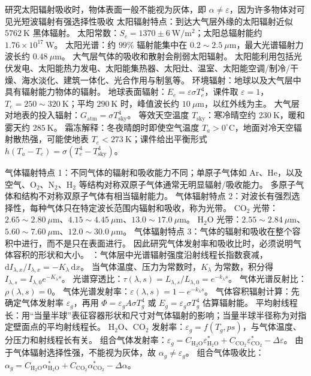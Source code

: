 
研究太阳辐射吸收时，物体表面一般不能视为灰体，即 $\alpha\ne\varepsilon$，因为许多物体对可见光短波辐射有强选择性吸收
太阳辐射特点：到达大气层外缘的太阳辐射近似 $5762\ \mathrm{K}$ 黑体辐射。
太阳常数：$S_c=1370\pm6\ \mathrm{W/m^2}$；太阳总辐射能约 $1.76\times10^{17}\ \mathrm{W}$。
太阳光谱：约 $99\%$ 辐射能集中在 $0.2\sim2.5\ \mu\mathrm{m}$，最大光谱辐射力波长约 $0.48\ \mu\mathrm{m}$。
大气层气体的吸收和散射会削弱太阳辐射。
太阳能利用包括光伏发电、太阳能热力发电、太阳能集热器、太阳灶、温室、太阳能空调/制冷/干燥、海水淡化、建筑一体化、光合作用与制氢等。
环境辐射：地球以及大气层中具有辐射能力物体的辐射。
地球表面辐射：$E_e=\varepsilon\sigma T_e^4$，课件取 $\varepsilon=1$，$T_e=250\sim320\ \mathrm{K}$；平均 $290\ \mathrm{K}$ 时，峰值波长约 $10\ \mu\mathrm{m}$，以红外线为主。
大气层对地表的投入辐射：$G_{\mathrm{atm}}=\sigma T_{\mathrm{sky}}^4$。
等效天空温度 $T_{\mathrm{sky}}$：寒冷晴空约 $230\ \mathrm{K}$，暖和雾天约 $285\ \mathrm{K}$。
霜冻解释：冬夜晴朗时即使空气温度 $T_a>0^\circ\mathrm{C}$，地面对冷天空辐射散热强，可能使地表 $T_e<273\ \mathrm{K}$；课件给出平衡形式 $h(T_a-T_e)=\sigma(T_e^4-T_{\mathrm{sky}}^4)$。

\divider


气体辐射特点 1：不同气体的辐射和吸收能力不同；单原子气体如 $\mathrm{Ar}$、$\mathrm{He}$，以及空气、$\mathrm{O_2}$、$\mathrm{N_2}$、$\mathrm{H_2}$ 等结构对称双原子气体通常无明显辐射/吸收能力。
多原子气体和结构不对称双原子气体有相当辐射能力。
气体辐射特点 2：对波长有强烈选择性，每种气体只在特定波长范围内辐射和吸收，称为光带。
$\mathrm{CO_2}$ 光带：$2.65\sim2.80\ \mu\mathrm{m}$、$4.15\sim4.45\ \mu\mathrm{m}$、$13.0\sim17.0\ \mu\mathrm{m}$。
$\mathrm{H_2O}$ 光带：$2.55\sim2.84\ \mu\mathrm{m}$、$5.60\sim7.60\ \mu\mathrm{m}$、$12.0\sim30.0\ \mu\mathrm{m}$。
气体辐射特点 3：气体的辐射和吸收在整个容积中进行，而不是只在表面进行。
因此研究气体发射率和吸收比时，必须说明气体容积的形状和大小。
：气体层中光谱辐射强度沿射线程长指数衰减，$\mathrm{d}I_{\lambda,x}/I_{\lambda,x}=-K_\lambda\,\mathrm{d}x$。
当气体温度、压力为常数时，$K_\lambda$ 为常数，积分得 $I_{\lambda,s}=I_{\lambda,0}e^{-K_\lambda s}$。
光谱穿透比：$\tau(\lambda,s)=L_{\lambda,s}/L_{\lambda,0}=e^{-k_\lambda s}$。
气体光谱反射比：$\rho(\lambda,s)=0$。
气体光谱发射率：$\varepsilon(\lambda,s)=1-e^{-k_\lambda s}$。
气体容积辐射计算：先确定气体发射率 $\varepsilon_g$，再用 $\Phi=\varepsilon_g A\sigma T_g^4$ 或 $E_g=\varepsilon_g\sigma T_g^4$ 估算辐射能。
平均射线程长：用“当量半球”表征容器形状和尺寸对气体辐射的影响；当量半球半径称为对指定壁面点的平均射线程长。
$\mathrm{H_2O}$、$\mathrm{CO_2}$ 发射率：$\varepsilon_g=f(T_g,ps)$，与气体温度、分压力和射线程长有关。
组合气体发射率：$\varepsilon_g=C_{\mathrm{H_2O}}\varepsilon_{\mathrm{H_2O}}^*+C_{\mathrm{CO_2}}\varepsilon_{\mathrm{CO_2}}^*-\Delta\varepsilon$。
由于气体辐射选择性强，不能视为灰体，故 $\alpha_g\ne\varepsilon_g$。
组合气体吸收比：$\alpha_g=C_{\mathrm{H_2O}}\alpha_{\mathrm{H_2O}}^*+C_{\mathrm{CO_2}}\alpha_{\mathrm{CO_2}}^*-\Delta\alpha$。

